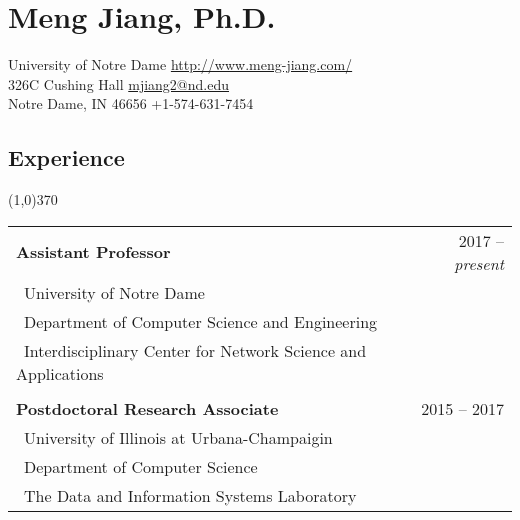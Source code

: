 \documentclass[10pt]{article}
\begin{document}
\setcounter{secnumdepth}{0}

\thispagestyle{firststyle}

\section{\LARGE{\sc Meng Jiang, Ph.D.}}
University of Notre Dame \hfill \url{http://www.meng-jiang.com/} \\
326C Cushing Hall \hfill \url{mjiang2@nd.edu}\\
Notre Dame, IN 46656 \hfill +1-574-631-7454



\subsection{\sc Experience}
\vspace{-0.4cm} \line(1,0){370} \vspace{0.1cm}

\begin{table}[h!]
\begin{tabular*}{12.7cm}{p{6.5cm}p{1.25cm}r}
\bf{Assistant Professor}&~&~~2017 -- \emph{present}\\
 \multicolumn{2}{l}{~{University of Notre Dame}}\\
 \multicolumn{2}{l}{~{Department of Computer Science and Engineering}}\\
 \multicolumn{2}{l}{~{Interdisciplinary Center for Network Science and Applications}}\\
\\
\bf{Postdoctoral Research Associate}&~&~~2015 -- 2017\\
 \multicolumn{2}{l}{~{University of Illinois at Urbana-Champaigin}}\\
 \multicolumn{2}{l}{~{Department of Computer Science}}\\
 \multicolumn{2}{l}{~{The Data and Information Systems Laboratory}}
\end{tabular*}
\end{table}
\vspace{-0.4cm}
\end{document}
